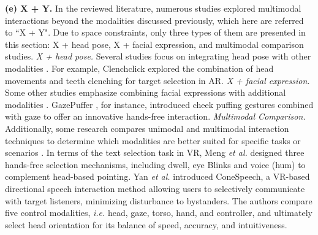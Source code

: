 \documentclass[review]{fcs}
\newcommand{\revise}[2]{\textcolor[rgb]{0,0,0}{#2}}
\begin{document}
\textbf{(e) X + Y.} In the reviewed literature, numerous studies explored multimodal interactions beyond the modalities discussed previously, which here are referred to ``X + Y". Due to space constraints, only three types of them are presented in this section: X + head pose, X + facial expression, and multimodal comparison studies.
\textit{X + head pose.}
Several studies focus on integrating head pose with other modalities \cite{DBLP:journals/imwut/ShenYYS22, DBLP:conf/chi/WeiSYW0YL23, DBLP:conf/chi/HouNSKBG23, marquardt2024selection, DBLP:conf/chi/LeeWSG24}. 
\revise{For example, Clenchclick explored explored the combination of head movements and teeth clenching for target selection in AR \cite{DBLP:journals/imwut/ShenYYS22}. }{For example, Clenchclick \cite{DBLP:journals/imwut/ShenYYS22} explored the combination of head movements and teeth clenching for target selection in AR. }
\textit{X + facial expression.}
Some other studies emphasize combining facial expressions with additional modalities \cite{DBLP:conf/vr/LaiSL24, DBLP:conf/uist/0001QTFLS22}. 
\revise{GazePuffer, for instance, introduced cheek puffing gestures combined with gaze to offer an innovative hands-free interaction \cite{DBLP:conf/vr/LaiSL24}.}{GazePuffer \cite{DBLP:conf/vr/LaiSL24}, for instance, introduced cheek puffing gestures combined with gaze to offer an innovative hands-free interaction.}
\textit{Multimodal Comparison.}
Additionally, some research compares unimodal and multimodal interaction techniques to determine which modalities are better suited for specific tasks or scenarios \cite{10049667, DBLP:conf/ismar/MengXL22, DBLP:conf/ismar/XuMYSL22}.
\revise{In terms of the text selection task in VR, Meng \textit{et al.} designed three hands-free selection mechanisms, including dwell, eye Blinks and voice (hum) to complement head-based pointing \cite{DBLP:conf/ismar/MengXL22}. Yan \textit{et al.} introduced ConeSpeech, a VR-based directional speech interaction method allowing users to selectively communicate with target listeners, minimizing disturbance to bystanders \cite{10049667}.}{In terms of the text selection task in VR, Meng \textit{et al.} \cite{DBLP:conf/ismar/MengXL22} designed three hands-free selection mechanisms, including dwell, eye Blinks and voice (hum) to complement head-based pointing. Yan \textit{et al.} \cite{10049667} introduced ConeSpeech, a VR-based directional speech interaction method allowing users to selectively communicate with target listeners, minimizing disturbance to bystanders.} The authors compare five control modalities, \textit{i.e.} head, gaze, torso, hand, and controller, and ultimately select head orientation for its balance of speed, accuracy, and intuitiveness.
\end{document}
